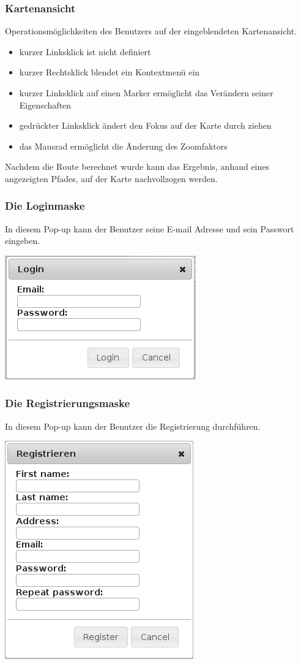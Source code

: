 \documentclass[a4paper,10pt,titlepage]{article}
\begin{document}
\subsubsection{Kartenansicht}
Operationsmöglichkeiten des Benutzers auf der eingeblendeten Kartenansicht.
\begin {itemize}
\item kurzer Linksklick ist nicht definiert
\item kurzer Rechtsklick blendet ein Kontextmenü ein
\item kurzer Linksklick auf einen Marker ermöglicht das Verändern seiner Eigenschaften
\item gedrückter Linksklick ändert den Fokus auf der Karte durch ziehen
\item das Mausrad ermöglicht die Änderung des Zoomfaktors
\end {itemize}
Nachdem die Route berechnet wurde kann das Ergebnis, anhand eines angezeigten Pfades, auf der Karte nachvollzogen werden.

\subsubsection{Die Loginmaske}
In diesem Pop-up kann der Benutzer seine E-mail Adresse und sein Passwort eingeben.
\begin {center}
\includegraphics[scale=0.5]{media/web/Login.png}
\end {center}
\subsubsection{Die Registrierungsmaske}
In diesem Pop-up kann der Benutzer die Registrierung durchführen.
\begin {center}
\includegraphics[scale=0.5]{media/web/Register.png}
\end {center}
\end{document}
